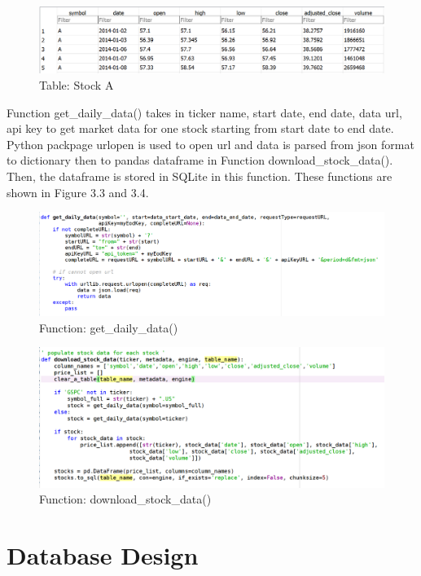 \begin{figure}
\centering
\includegraphics[scale=0.6]{data/images/A.png}
\caption{Table: Stock A}
\label{fig:stockA}
\end{figure}

Function get\_daily\_data() takes in ticker name, start date, end date, data url, api key to get market data for one stock starting from start date to end date. Python packpage urlopen is used to open url and data is parsed from json format to dictionary then to pandas dataframe in Function download\_stock\_data(). Then, the dataframe is stored in SQLite in this function. These functions are shown in Figure 3.3 and 3.4.

\begin{figure}
\centering
\includegraphics[scale=0.6]{data/images/getdailydata.png}
\caption{Function: get\_daily\_data()}
\label{fig:getdailydata}
\end{figure}

\begin{figure}
\centering
\includegraphics[scale=0.6]{data/images/downloaddata.png}
\caption{Function: download\_stock\_data()}
\label{fig:downloaddata}
\end{figure}


\section{Database Design}

